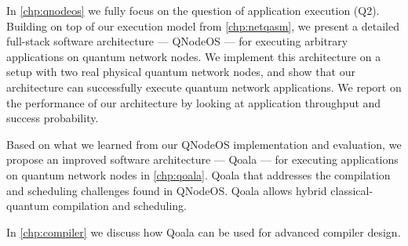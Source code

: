 In \cref{chp:qnodeos} we fully focus on the question of application execution (Q2).
Building on top of our execution model from \cref{chp:netqasm}, we present a detailed full-stack software architecture --- QNodeOS --- for executing arbitrary applications on quantum network nodes.
We implement this architecture on a setup with two real physical quantum network nodes, and show that our architecture can successfully execute quantum network applications.
We report on the performance of our architecture by looking at application throughput and success probability.


Based on what we learned from our QNodeOS implementation and evaluation, we propose an improved software architecture --- Qoala --- for executing applications on quantum network nodes in \cref{chp:qoala}.
Qoala that addresses the compilation and scheduling challenges found in QNodeOS.
Qoala allows hybrid classical-quantum compilation and scheduling.

In \cref{chp:compiler} we discuss how Qoala can be used for advanced compiler design.







\begin{xstretch}
\printbibliography[heading=subbibintoc,title={References},notcategory=noprint]
\end{xstretch}

